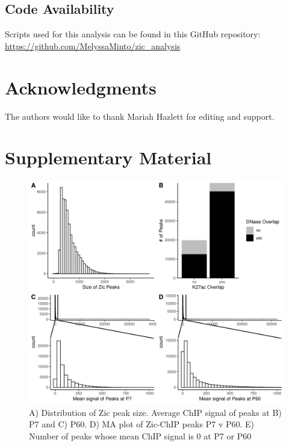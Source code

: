 \documentclass[fleqn,10pt,twocolumn]{wlscirep}
\begin{document}
\subsection*{Code Availability}
Scripts used for this analysis can be found in this GitHub repository: \href{https://github.com/MelyssaMinto/zic_analysis}{https://github.com/MelyssaMinto/zic_analysis}

\section*{Acknowledgments}
The authors would like to thank Mariah Hazlett for editing and support. 




\clearpage


\beginsupplement
\section*{Supplementary Material}

\begin{figure}[ht]
\centering
\includegraphics[width=.90\linewidth]{../figures/supp_figure1.png}
\caption{A) Distribution of Zic peak size. Average ChIP signal of peaks at B) P7 and C) P60. D) MA plot of Zic-ChIP peaks P7 v P60. E) Number of peaks whose mean ChIP signal is 0 at P7 or P60}
\label{fig:ZicStats}
\end{figure}
\end{document}
